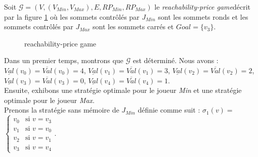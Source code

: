 
\begin{exemple}
	Soit $\mathcal{G} = (V,(V_{Min},V_{Max}),E,RP_{Min},RP_{Max})$ le \og\textit{reachability-price game}\fg décrit par la figure \ref{ex:reachPriceGame1} où les sommets contrôlés par $J_{Min}$ sont les sommets ronds et les sommets contrôlés par $J_{Max}$ sont les sommets carrés et $Goal = \{ v_{3} \}$.
	
	\begin{figure}[ht!]
		\centering



		\caption{reachability-price game}
		\label{ex:reachPriceGame1}


	\end{figure}
	
Dans un premier temps, montrons que $\mathcal{G}$ est déterminé. Nous avons : $\underline{Val}(v_{0})=\overline{Val}(v_{0})=4$,  $\underline{Val}(v_{1})=\overline{Val}(v_{1}) =3$, $\underline{Val}(v_{2})=\overline{Val}(v_{2})= 2$,  $\underline{Val}(v_{3})=\overline{Val}(v_{3})= 0$, $\underline{Val}(v_{4})=\overline{Val}(v_{4})= 1$.\\


Ensuite, exhibons une stratégie optimale pour le joueur \textit{Min} et une stratégie optimale pour le joueur \textit{Max}.\\

\noindent Prenons la stratégie sans mémoire de $J_{Min}$ définie comme suit : $\sigma _{1}(v) = $ $\begin{cases}
																						v_{0} & \text{si }v = v_{3}\\
																						v_{1} & \text{si }v = v_{0}\\
																						v_{2} & \text{si }v = v_{1}\\
																						v_{3} & \text{si }v = v_{4}
																					\end{cases}$.


\end{exemple}
